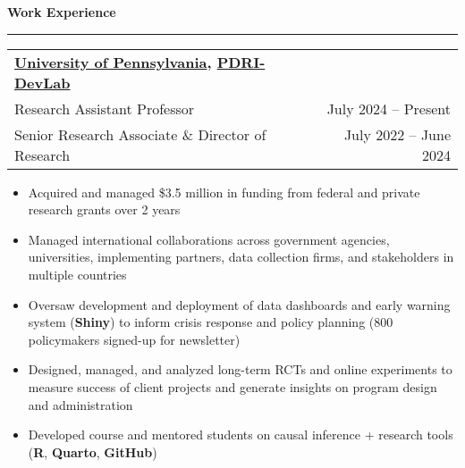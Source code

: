 \documentclass[11pt]{article}
\begin{document}
\textbf{\large Work Experience}\\
\rule[3mm]{\textwidth}{.2pt}
\noindent\begin{tabular*}{\textwidth}{@{}l@{\extracolsep{\fill}}r@{}}
\textbf{\href{https://www.polisci.upenn.edu/}{University of Pennsylvania}, \href{https://web.sas.upenn.edu/dev-lab/}{PDRI-DevLab}}\\
Research Assistant Professor & July 2024 -- Present\\
Senior Research Associate \& Director of Research & July 2022 -- June 2024\\
\end{tabular*}
\begin{itemize}[itemsep=0mm, parsep=0pt]
\item Acquired and managed \$3.5 million in funding from federal and private research grants over 2 years
\item Managed international collaborations across government agencies, universities, implementing partners, data collection firms, and stakeholders in multiple countries
\item Oversaw development and deployment of data dashboards and early warning system (\textbf{Shiny}) to inform crisis response and policy planning (800 policymakers signed-up for newsletter)
\item Designed, managed, and analyzed long-term RCTs and online experiments to measure success of client projects and generate insights on program design and administration
\item Developed course and mentored students on causal inference + research tools (\textbf{R}, \textbf{Quarto}, \textbf{GitHub})
\end{itemize}
% 
\end{document}
